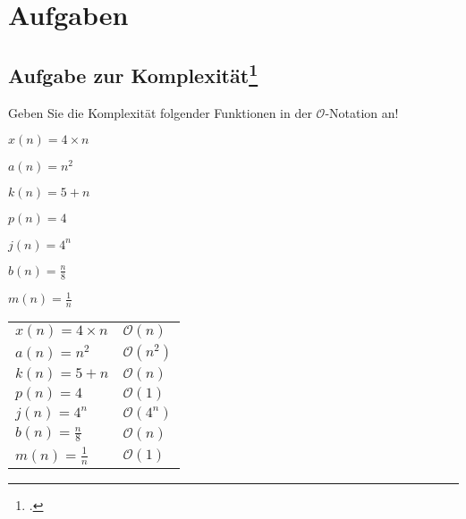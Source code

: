 \documentclass{lehramt-informatik-haupt}
\begin{document}
\chapter{Aufgaben}

%

%

\section{Aufgabe zur Komplexität\footcite[Seite 1-2]{aud:pu:2}}

\noindent
Geben Sie die Komplexität folgender Funktionen in der
$\mathcal{O}$-Notation an!

\begin{compactitem}
\item $x(n) = 4 \times n$
\item $a(n) = n^2$
\item $k(n) = 5 + n$
\item $p(n) = 4$
\item $j(n) = 4^n$
\item $b(n) = \frac{n}{8}$
\item $m(n) = \frac{1}{n}$
\end{compactitem}

\begin{antwort}
\begin{tabular}{ll}
$x(n) = 4 \times n$  & $\mathcal{O}(n)$\\
$a(n) = n^2$         & $\mathcal{O}(n^2)$ \\
$k(n) = 5 + n$       & $\mathcal{O}(n)$ \\
$p(n) = 4$           & $\mathcal{O}(1)$ \\
$j(n) = 4^n$         & $\mathcal{O}(4^n)$ \\
$b(n) = \frac{n}{8}$ & $\mathcal{O}(n)$\\
$m(n) = \frac{1}{n}$ & $\mathcal{O}(1)$\\
\end{tabular}
\end{antwort}

%
\end{document}

